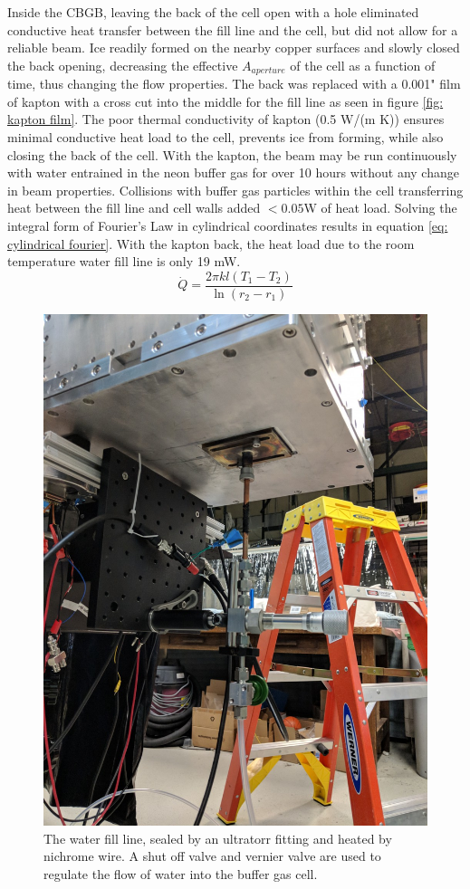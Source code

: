 Inside the CBGB, leaving the back of the cell open with a hole eliminated conductive heat transfer between the fill line and the cell, but did not allow for a reliable beam. Ice readily formed on the nearby copper surfaces and slowly closed the back opening, decreasing the effective $A_{aperture}$ of the cell as a function of time, thus changing the flow properties. The back was replaced with a 0.001" film of kapton with a cross cut into the middle for the fill line as seen in figure \ref{fig: kapton film}. The poor thermal conductivity of kapton (0.5 W/(m K)) ensures minimal conductive heat load to the cell, prevents ice from forming, while also closing the back of the cell. With the kapton, the beam may be run continuously with water entrained in the neon buffer gas for over 10 hours without any change in beam properties. Collisions with buffer gas particles within the cell transferring heat between the fill line and cell walls added $<0.05$W of heat load. Solving the integral form of Fourier's Law in cylindrical coordinates results in equation \ref{eq: cylindrical fourier}. With the kapton back, the heat load due to the room temperature water fill line is only 19 mW.
\begin{equation}
	\dot{Q} = \frac{2 \pi k l (T_1 - T_2)}{\ln(r_2 - r_1)}
	\label{eq: cylindrical fourier}
\end{equation}

\begin{figure}[H]
	\centering
	\includegraphics[width=.5\textwidth]{images/CBGB_water_fill_outside.jpg}
	\caption{The water fill line, sealed by an ultratorr fitting and heated by nichrome wire. A shut off valve and vernier valve are used to regulate the flow of water into the buffer gas cell.}
	\label{fig: water fill bottom}
\end{figure}

